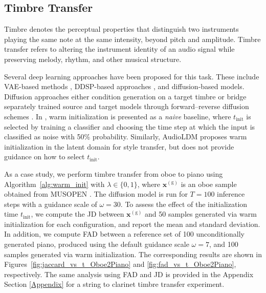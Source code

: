 \subsection{Timbre Transfer}
Timbre denotes the perceptual properties that distinguish two instruments playing the same note at the same intensity, beyond pitch and amplitude. Timbre transfer refers to altering the instrument identity of an audio signal while preserving melody, rhythm, and other musical structure.

Several deep learning approaches have been proposed for this task. These include VAE-based methods \cite{esling2018generativetimbrespacesregularizing, caillon2021ravevariationalautoencoderfast, colonel2020conditioningautoencoderlatentspaces}, DDSP-based approaches \cite{carney2021tonetransfer}, and diffusion-based models. Diffusion approaches either condition generation on a target timbre \cite{ baoueb2024wavetransferflexibleendtoendmultiinstrument, comanducci2023timbretransferusingimagetoimage, garcía2025sketch2soundcontrollableaudiogeneration, li2024musicstyletransfertimevarying, huang2024musicstyletransferdiffusion} or bridge separately trained source and target models through forward–reverse diffusion schemes \cite{mancusi2025latentdiffusionbridgesunsupervised}. In \cite{lee2026diffusiontimbretransfermutual}, warm initialization is presented as a \textit{naive} baseline, where $t_\text{init}$ is selected by training a classifier and choosing the time step at which the input is classified as noise with 50\% probability. Similarly, AudioLDM \cite{liu2023audioldm} proposes
warm initialization in the latent domain for style transfer, but does not provide guidance on how to select $t_\text{init}$.

As a case study, we perform timbre transfer from oboe to piano using Algorithm~\ref{alg:warm_init} with $\lambda \in \{0,1\}$, where $\mathbf{x}^{(\mathrm g)}$ is an oboe sample obtained from MUSOPEN \cite{musopen_platform}. The diffusion model is run for $T=100$ inference steps with a guidance scale of $\omega =30$. To assess the effect of the initialization time $t_\text{init}$, we compute the JD between $\mathbf{x}^{(\mathrm g)}$ and 50 samples generated via warm initialization for each configuration, and report the mean and standard deviation. In addition, we compute FAD between a reference set of 100 unconditionally generated piano,  produced using the default guidance scale $\omega =7$, and 100 samples generated via warm initialization. The corresponding results are shown in  Figures~\ref{fig:jaccard_vs_t_Oboe2Piano} and \ref{fig:fad_vs_t_Oboe2Piano}, respectively.  The same analysis using FAD and JD is provided in the Appendix Section \ref{Appendix} for a string to clarinet timbre transfer experiment.


